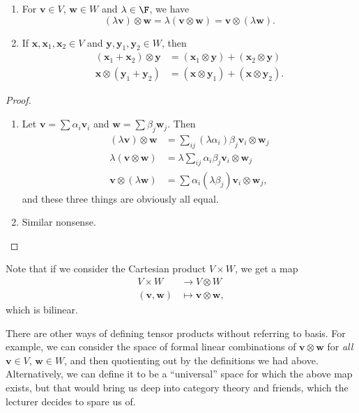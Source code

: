 \documentclass[a4paper]{article}
\begin{document}
\begin{lemma}\leavevmode
  \begin{enumerate}
    \item For $\mathbf{v} \in V$, $\mathbf{w} \in W$ and $\lambda \in \F$, we have
      \[
        (\lambda \mathbf{v}) \otimes \mathbf{w} = \lambda (\mathbf{v} \otimes \mathbf{w}) = \mathbf{v} \otimes (\lambda \mathbf{w}).
      \]
    \item If $\mathbf{x}, \mathbf{x}_1, \mathbf{x}_2 \in V$ and $\mathbf{y}, \mathbf{y}_1, \mathbf{y}_2 \in W$, then
      \begin{align*}
        (\mathbf{x}_1 + \mathbf{x}_2) \otimes \mathbf{y} &= (\mathbf{x}_1 \otimes \mathbf{y}) + (\mathbf{x}_2 \otimes \mathbf{y})\\
        \mathbf{x}\otimes (\mathbf{y}_1 + \mathbf{y}_2) &= (\mathbf{x}\otimes \mathbf{y}_1) + (\mathbf{x} \otimes \mathbf{y}_2).
      \end{align*}
  \end{enumerate}
\end{lemma}

\begin{proof}\leavevmode
  \begin{enumerate}
    \item Let $\mathbf{v} = \sum \alpha_i \mathbf{v}_i$ and $\mathbf{w} = \sum \beta_j \mathbf{w}_j$. Then
      \begin{align*}
        (\lambda \mathbf{v}) \otimes \mathbf{w} &= \sum_{ij} (\lambda \alpha_i) \beta_j \mathbf{v}_i \otimes \mathbf{w}_j \\
        \lambda (\mathbf{v}\otimes \mathbf{w}) &= \lambda \sum_{ij} \alpha_i \beta_j \mathbf{v}_i \otimes \mathbf{w}_j\\
        \mathbf{v}\otimes (\lambda \mathbf{w}) &= \sum \alpha_i (\lambda \beta_j) \mathbf{v}_i \otimes \mathbf{w}_j,
      \end{align*}
      and these three things are obviously all equal.
    \item Similar nonsense.
  \end{enumerate}
\end{proof}
Note that if we consider the Cartesian product $V \times W$, we get a map
\begin{align*}
  V\times W &\to V \otimes W\\
  (\mathbf{v}, \mathbf{w}) &\mapsto \mathbf{v}\otimes \mathbf{w},
\end{align*}
which is bilinear.

There are other ways of defining tensor products without referring to basis. For example, we can consider the space of formal linear combinations of $\mathbf{v} \otimes \mathbf{w}$ for \emph{all} $\mathbf{v} \in V$, $\mathbf{w} \in W$, and then quotienting out by the definitions we had above. Alternatively, we can define it to be a ``universal'' space for which the above map exists, but that would bring us deep into category theory and friends, which the lecturer decides to spare us of.
\end{document}
